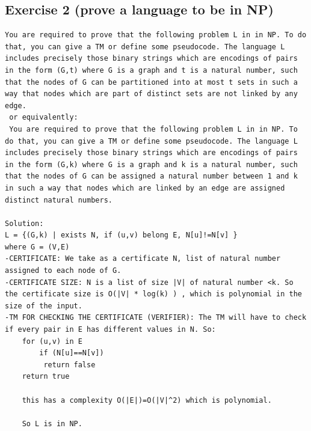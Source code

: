 \subsection{Exercise 2 (prove a language to be in NP)}
\begin{lstlisting}[breaklines]
You are required to prove that the following problem L in in NP. To do that, you can give a TM or define some pseudocode. The language L includes precisely those binary strings which are encodings of pairs in the form (G,t) where G is a graph and t is a natural number, such that the nodes of G can be partitioned into at most t sets in such a way that nodes which are part of distinct sets are not linked by any edge.
 or equivalently:
 You are required to prove that the following problem L in in NP. To do that, you can give a TM or define some pseudocode. The language L includes precisely those binary strings which are encodings of pairs in the form (G,k) where G is a graph and k is a natural number, such that the nodes of G can be assigned a natural number between 1 and k in such a way that nodes which are linked by an edge are assigned distinct natural numbers.
 
Solution:
L = {(G,k) | exists N, if (u,v) belong E, N[u]!=N[v] }
where G = (V,E)
-CERTIFICATE: We take as a certificate N, list of natural number assigned to each node of G.
-CERTIFICATE SIZE: N is a list of size |V| of natural number <k. So the certificate size is O(|V| * log(k) ) , which is polynomial in the size of the input.
-TM FOR CHECKING THE CERTIFICATE (VERIFIER): The TM will have to check if every pair in E has different values in N. So:
	for (u,v) in E
    	if (N[u]==N[v])
         return false
    return true
    
    this has a complexity O(|E|)=O(|V|^2) which is polynomial.
    
    So L is in NP.
   
\end{lstlisting}
